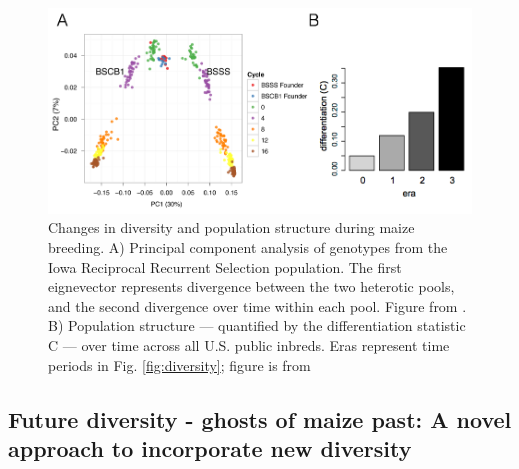 \documentclass[12pt]{article}
\begin{document}
\begin{figure}[ht]
\includegraphics[width=\linewidth]{joostgerke.png}
\caption{Changes in diversity and population structure during maize breeding.  
A) Principal component analysis of genotypes from the Iowa Reciprocal Recurrent Selection population. The first eignevector represents divergence between the two heterotic pools, and the second divergence over time within each pool. Figure from \citet{Gerke:2013tw}. 
B) Population structure --- quantified by the differentiation statistic C --- over time across all U.S. public inbreds. Eras represent time periods in Fig. \ref{fig:diversity}; figure is from \citep{van2012historical} } 
\label{fig:pca}
\end{figure}



\subsection*{Future diversity - ghosts of maize past: A novel approach to incorporate new diversity}
\end{document}
